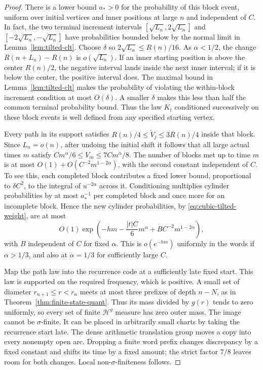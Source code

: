 \documentclass[11pt]{article}
\theoremstyle{definition}
\theoremstyle{remark}
\begin{document}
\begin{proof}
There is a lower bound $a_*>0$ for the probability of this
block event, uniform over initial vertices and inner positions
at large $n$ and independent of $C$. In fact, the two terminal
increment intervals $[\sqrt{L_n},2\sqrt{L_n}]$ and
$[-2\sqrt{L_n},-\sqrt{L_n}]$ have probabilities bounded below
by the normal limit in Lemma~\ref{lem:tilted-clt}.
Choose $\delta$ so $2\sqrt{L_n}\le R(n)/16$.
As $\alpha<1/2$, the change $R(n+L_n)-R(n)$ is $o(\sqrt{L_n})$.
If an inner starting position is above the center $R(n)/2$,
the negative interval lands inside the next inner interval;
if it is below the center, the positive interval does.
The maximal bound in Lemma~\ref{lem:tilted-clt} makes the
probability of violating the within-block increment condition
at most $O(\delta)$. A smaller $\delta$ makes this less than
half the common terminal probability bound.
Thus the law $K_t$ conditioned successively on these block
events is well defined from any specified starting vertex.

Every path in its support satisfies
$R(n)/4\le\widetilde V_j\le3R(n)/4$ inside that block.
Since $L_n=o(n)$, after undoing the initial shift it follows
that all large actual times $m$ satisfy
$Cm^\alpha/6\le V_m\le 7Cm^\alpha/8$.
The number of blocks met up to time $m$ is at most
$O(1)+O(C^{-2}m^{1-2\alpha})$, with the second constant
independent of $C$. To see this, each completed block
contributes a fixed lower bound, proportional to $\delta C^2$,
to the integral of $u^{-2\alpha}$ across it.
Conditioning multiplies cylinder probabilities by at most
$a_*^{-1}$ per completed block and once more for an incomplete
block. Hence the new cylinder probabilities, by
\eqref{eq:cubic-tilted-weight}, are at most
\[
 O(1)\exp\!\left(-hm-\frac{|t|C}{6}m^\alpha+
                       B C^{-2}m^{1-2\alpha}\right),
\]
with $B$ independent of $C$ for fixed $\alpha$.
This is $o(e^{-hm})$ uniformly in the words if $\alpha>1/3$,
and also at $\alpha=1/3$ for sufficiently large $C$.

Map the path law into the recurrence code at a sufficiently
late fixed start. This law is supported on the required
frequency, which is positive. A small set of diameter
$r_{n+1}\le r<r_n$ meets at most three prefixes of depth
$n-N$, as in Theorem~\ref{thm:finite-state-quant}.
Thus its mass divided by $g(r)$ tends to zero uniformly,
so every set of finite $\mathcal H^g$ measure has zero
outer mass. The image cannot be $\sigma$-finite.
It can be placed in arbitrarily small charts by taking the
recurrence start late. The dense arithmetic translation
group moves a copy into every nonempty open arc. Dropping
a finite word prefix changes discrepancy by a fixed
constant and shifts its time by a fixed amount; the strict
factor $7/8$ leaves room for both changes. Local
non-$\sigma$-finiteness follows.
\end{proof}
\end{document}
